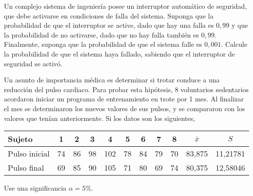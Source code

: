 \documentclass[11pt,spanish]{exam}
\begin{document}
\begin{questions}



\question[30]
Un complejo sistema de ingeniería posee un interruptor automático
de seguridad, que debe activarse en condiciones
de falla del sistema. Suponga que la probabilidad de que
el interruptor se active, dado que hay una falla es $0,99$ y
que la probabilidad de no activarse, dado que no hay falla
también es $0,99$. Finalmente, suponga que la probabilidad
de que el sistema falle es $0,001$. Calcule la probabilidad de
que el sistema haya fallado, sabiendo que el interruptor de
seguridad se activó.


\question
Un asunto de importancia médica es determinar si trotar conduce a una reducción del pulso cardiaco. Para probar esta hipótesis, 8 voluntarios sedentarios acordaron iniciar un programa de entrenamiento en trote por 1 mes. Al finalizar el mes se determinaron los nuevos valores de sus pulsos, y se compararon con los valores que tenían anteriormente. Si los datos son los siguientes, 
\begin{center}
\begin{tabular}{l|cccc cccc | c c}
Sujeto & 1 & 2 & 3 & 4 & 5 & 6 & 7 & 8 & $\overline x$ & $S$\\ \hline
Pulso inicial & 74 & 86 & 98 & 102 & 78 & 84 & 79 & 70 & 83,875 & 11,21781 \\
Pulso final & 69 & 85 & 90 & 105 & 71 & 80 & 69 & 74 & 80,375 & 12,58046
\end{tabular}
\end{center}

Use una significancia $\alpha=5\%$.
\begin{parts}

\end{parts}
\end{questions}
\end{document}
